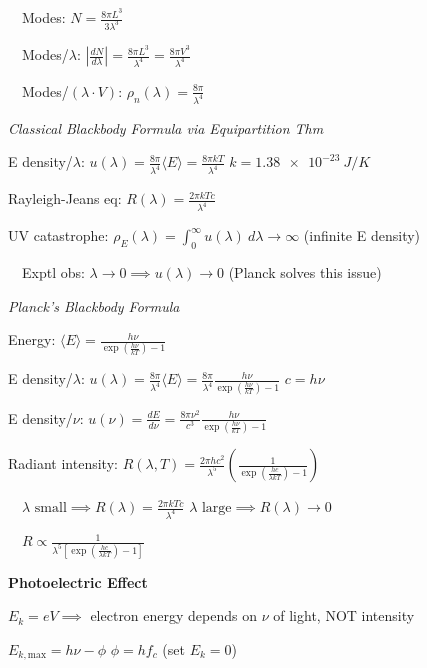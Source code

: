 \documentclass[twocolumn]{article}
\begin{document}
$\quad$Modes: $N = \frac{8 \pi L^3}{3 \lambda^3}$

$\quad$Modes/$\lambda$: $\left| \frac{dN}{d \lambda} \right| = \frac{8 \pi L^3}{\lambda^4} = \frac{8 \pi V^3}{\lambda^4}$

$\quad$Modes/$(\lambda \cdot V)$: $\rho_n(\lambda) = \frac{8 \pi}{\lambda^4}$

\dotfill

\textit{Classical Blackbody Formula via Equipartition Thm}

E density/$\lambda$: $u(\lambda) = \frac{8 \pi}{\lambda^4} \langle E \rangle = \frac{8 \pi kT}{\lambda^4}$ \hfill $k = \SI{1.38e-23}{J/K}$

Rayleigh-Jeans eq: $R(\lambda) = \frac{2 \pi k Tc}{\lambda^4}$

UV catastrophe: $\rho_E(\lambda) = \int_0^\infty u(\lambda)\ d\lambda \to \infty$ \hfill (infinite E density)

$\quad$Exptl obs: $\lambda \to 0 \implies u(\lambda) \to 0$ \hfill (Planck solves this issue)

\vspace{-.5em}
\dotfill

\textit{Planck's Blackbody Formula}

Energy: $\langle E \rangle = \frac{h \nu}{\exp \left( \frac{h \nu}{kT} \right) - 1}$

E density/$\lambda$: $u(\lambda) = \frac{8\pi}{\lambda^4} \langle E \rangle = \frac{8\pi}{\lambda^4} \frac{h\nu}{\exp \left( \frac{h \nu}{kT} \right) - 1}$ \hfill $c = h\nu$


\newpage


E density/$\nu$: $u(\nu) = \frac{dE}{d\nu} = \frac{8\pi\nu^2}{c^3} \frac{h\nu}{\exp \left( \frac{h \nu}{kT} \right)-1}$

Radiant intensity: $R(\lambda, T) = \frac{2 \pi h c^2}{ \lambda^5} \left( \frac{1}{\exp \left( \frac{hc}{\lambda kT} \right) - 1} \right)$

$\quad \lambda \text{ small} \implies R(\lambda) = \frac{2\pi kTc}{\lambda^4}$ \hfill $\lambda \text{ large} \implies R(\lambda) \to 0$

$\quad R \propto \frac{1}{\lambda^5 \left[ \exp \left( \frac{hc}{\lambda k T} \right) - 1 \right]}$

\dotfill

\textbf{Photoelectric Effect}

$E_k = eV \implies$ electron energy depends on $\nu$ of light, NOT intensity

$E_{k, \text{max}} = h \nu - \phi$ \hfill $\phi = hf_c$ (set $E_k = 0$)
\end{document}
